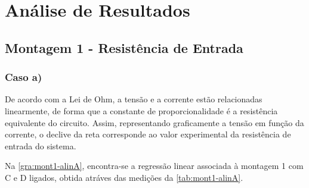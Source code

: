 \section{Análise de Resultados}

\tabelaRegressoes
{}\of{\tabelaRegressoes} \let\slopeI\pgfplotsretval
{}\of{\tabelaRegressoes} \let\slopeII\pgfplotsretval
{}\of{\tabelaRegressoes} \let\slopeIII\pgfplotsretval
{}\of{\tabelaRegressoes} \let\interceptI\pgfplotsretval
{}\of{\tabelaRegressoes} \let\interceptII\pgfplotsretval
{}\of{\tabelaRegressoes} \let\interceptIII\pgfplotsretval


\tabelaResult
{}\of{\tabelaResult} \let\teoI\pgfplotsretval
{}\of{\tabelaResult} \let\teoII\pgfplotsretval
{}\of{\tabelaResult} \let\teoIII\pgfplotsretval
{}\of{\tabelaResult} \let\expI\pgfplotsretval
{}\of{\tabelaResult} \let\expII\pgfplotsretval
{}\of{\tabelaResult} \let\expIII\pgfplotsretval
{}\of{\tabelaResult} \let\exatI\pgfplotsretval
{}\of{\tabelaResult} \let\exatII\pgfplotsretval
{}\of{\tabelaResult} \let\exatIII\pgfplotsretval

\of{\tabelaResult} \let\VexpIII\pgfplotsretval
{}\of{\tabelaResult} \let\VteoIII\pgfplotsretval

\subsection{Montagem 1 - Resistência de Entrada}
\subsubsection{Caso a)}
De acordo com a Lei de Ohm, a tensão e a corrente estão relacionadas linearmente, de forma que a constante de proporcionalidade é a resistência equivalente do circuito. Assim, representando graficamente a tensão em função da corrente, o declive da reta corresponde ao valor experimental da resistência de entrada do sistema.

Na \cref{gra:mont1-alinA}, encontra-se a regressão linear associada à montagem 1 com C e D ligados, obtida atráves das medições da \cref{tab:mont1-alinA}.

